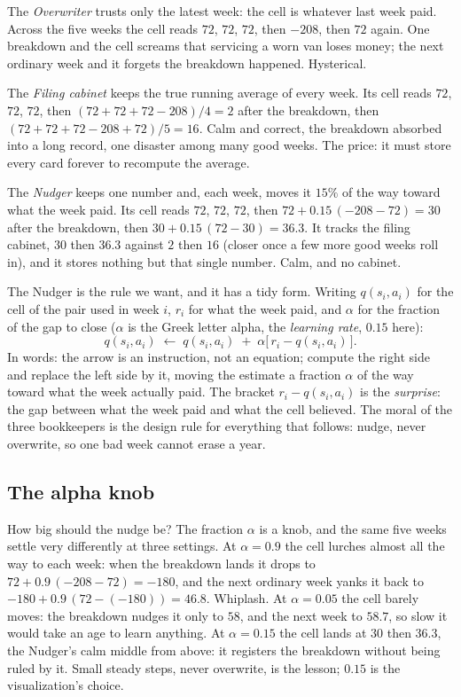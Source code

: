\documentclass[11pt,a4paper]{article}
\theoremstyle{definition}
\theoremstyle{remark}
\numberwithin{equation}{section}
\begin{document}
The \emph{Overwriter} trusts only the latest week: the cell is whatever last week paid. Across
the five weeks the cell reads $72$, $72$, $72$, then $-208$, then $72$ again. One breakdown and
the cell screams that servicing a worn van loses money; the next ordinary week and it forgets
the breakdown happened. Hysterical.

The \emph{Filing cabinet} keeps the true running average of every week. Its cell reads $72$,
$72$, $72$, then $(72+72+72-208)/4 = 2$ after the breakdown, then $(72+72+72-208+72)/5 = 16$.
Calm and correct, the breakdown absorbed into a long record, one disaster among many good
weeks. The price: it must store every card forever to recompute the average.

The \emph{Nudger} keeps one number and, each week, moves it $15\%$ of the way toward what the
week paid. Its cell reads $72$, $72$, $72$, then $72 + 0.15\,(-208 - 72) = 30$ after the
breakdown, then $30 + 0.15\,(72 - 30) = 36.3$. It tracks the filing cabinet, $30$ then $36.3$
against $2$ then $16$ (closer once a few more good weeks roll in), and it stores nothing but
that single number. Calm, and no cabinet.

The Nudger is the rule we want, and it has a tidy form. Writing $q(s_i, a_i)$ for the cell of
the pair used in week $i$, $r_i$ for what the week paid, and $\alpha$ for the fraction of the
gap to close ($\alpha$ is the Greek letter alpha, the \emph{learning rate}, $0.15$ here):
\begin{equation}\label{eq:cashrule}
q(s_i, a_i) \;\leftarrow\; q(s_i, a_i) \;+\; \alpha \bigl[\, r_i - q(s_i, a_i) \,\bigr].
\end{equation}
In words: the arrow is an instruction, not an equation; compute the right side and replace the
left side by it, moving the estimate a fraction $\alpha$ of the way toward what the week
actually paid. The bracket $r_i - q(s_i, a_i)$ is the \emph{surprise}: the gap between what
the week paid and what the cell believed. The moral of the three bookkeepers is the design
rule for everything that follows: nudge, never overwrite, so one bad week cannot erase a year.

\subsection*{The alpha knob}

How big should the nudge be? The fraction $\alpha$ is a knob, and the same five weeks settle
very differently at three settings. At $\alpha = 0.9$ the cell lurches almost all the way to
each week: when the breakdown lands it drops to $72 + 0.9\,(-208 - 72) = -180$, and the next
ordinary week yanks it back to $-180 + 0.9\,(72 - (-180)) = 46.8$. Whiplash. At $\alpha = 0.05$
the cell barely moves: the breakdown nudges it only to $58$, and the next week to $58.7$, so
slow it would take an age to learn anything. At $\alpha = 0.15$ the cell lands at $30$ then
$36.3$, the Nudger's calm middle from above: it registers the breakdown without being ruled by
it. Small steady steps, never overwrite, is the lesson; $0.15$ is the visualization's choice.
\end{document}
